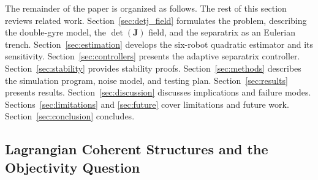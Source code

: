 \documentclass[lettersize,journal]{IEEEtran}
\begin{document}
The remainder of the paper is organized as follows. The rest of this
section reviews related work. Section~\ref{sec:detj_field} formulates the
problem, describing the double-gyre model, the $\det(\mathbf{J})$ field, and
the separatrix as an Eulerian trench.
Section~\ref{sec:estimation} develops the six-robot quadratic estimator
and its sensitivity. Section~\ref{sec:controllers} presents the adaptive
separatrix controller.
Section~\ref{sec:stability} provides stability proofs.
Section~\ref{sec:methods} describes the simulation program, noise model, and
testing plan. Section~\ref{sec:results} presents results.
Section~\ref{sec:discussion} discusses implications and failure modes.
Sections~\ref{sec:limitations} and \ref{sec:future} cover limitations and
future work. Section~\ref{sec:conclusion} concludes.



\subsection{Lagrangian Coherent Structures and the Objectivity Question}
\end{document}
